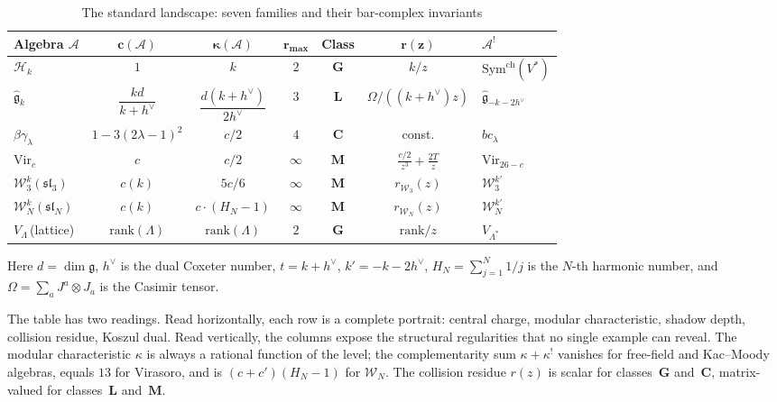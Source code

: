 \documentclass[11pt,reqno]{amsart}
\theoremstyle{definition}
\theoremstyle{remark}
\newcommand{\cA}{\mathcal{A}}
\newcommand{\cH}{\mathcal{H}}
\newcommand{\fg}{\mathfrak{g}}
\newcommand{\Sym}{\mathrm{Sym}}
\newcommand{\Vir}{\mathrm{Vir}}
\numberwithin{equation}{section}
\newcommand{\cW}{\mathcal{W}}
\begin{document}
\begin{table}[ht]
\centering
\caption{The standard landscape: seven families and their
 bar-complex invariants}
\label{tab:census}
\renewcommand{\arraystretch}{1.7}
{\small
\begin{tabular}{lcccccl}
\toprule
\textbf{Algebra $\cA$}
 & $\boldsymbol{c(\cA)}$
 & $\boldsymbol{\kappa(\cA)}$
 & $\boldsymbol{r_{\max}}$
 & \textbf{Class}
 & $\boldsymbol{r(z)}$
 & $\boldsymbol{\cA^!}$ \\
\midrule
$\cH_k$
 & $1$
 & $k$
 & $2$ & $\mathbf{G}$
 & $k/z$
 & $\Sym^{\mathrm{ch}}(V^*)$ \\[2pt]
$\widehat{\fg}_k$
 & $\dfrac{kd}{k+h^\vee}$
 & $\dfrac{d(k+h^\vee)}{2h^\vee}$
 & $3$ & $\mathbf{L}$
 & $\Omega/((k{+}h^\vee)z)$
 & $\widehat{\fg}_{-k-2h^\vee}$ \\[6pt]
$\beta\gamma_\lambda$
 & $1-3(2\lambda{-}1)^2$
 & $c/2$
 & $4$ & $\mathbf{C}$
 & const.
 & $bc_\lambda$ \\[2pt]
$\Vir_c$
 & $c$
 & $c/2$
 & $\infty$ & $\mathbf{M}$
 & $\frac{c/2}{z^3} + \frac{2T}{z}$
 & $\Vir_{26-c}$ \\[4pt]
$\cW^k_3(\mathfrak{sl}_3)$
 & $c(k)$
 & $5c/6$
 & $\infty$ & $\mathbf{M}$
 & $r_{\cW_3}(z)$
 & $\cW^{k'}_3$ \\[2pt]
$\cW^k_N(\mathfrak{sl}_N)$
 & $c(k)$
 & $c \cdot (H_N{-}1)$
 & $\infty$ & $\mathbf{M}$
 & $r_{\cW_N}(z)$
 & $\cW^{k'}_N$ \\[2pt]
$V_\Lambda$\,(lattice)
 & $\mathrm{rank}(\Lambda)$
 & $\mathrm{rank}(\Lambda)$
 & $2$ & $\mathbf{G}$
 & $\mathrm{rank}/z$
 & $V_{\Lambda^*}$ \\
\bottomrule
\end{tabular}
}
\end{table}

\noindent
Here $d = \dim\fg$, $h^\vee$ is the dual Coxeter number,
$t = k + h^\vee$, $k' = -k - 2h^\vee$,
$H_N = \sum_{j=1}^{N} 1/j$ is the $N$-th harmonic number,
and $\Omega = \sum_a J^a \otimes J_a$ is the Casimir tensor.

The table has two readings. Read horizontally, each row is
a complete portrait: central charge, modular characteristic,
shadow depth, collision residue, Koszul dual. Read
vertically, the columns expose the structural regularities
that no single example can reveal. The modular characteristic
$\kappa$ is always a rational function of the level;
the complementarity sum $\kappa + \kappa^!$ vanishes for
free-field and Kac--Moody algebras, equals $13$ for
Virasoro, and is $(c + c')(H_N - 1)$ for
$\cW_N$. The collision residue $r(z)$ is scalar for
classes~$\mathbf{G}$ and~$\mathbf{C}$, matrix-valued for
classes~$\mathbf{L}$ and~$\mathbf{M}$.
\end{document}
